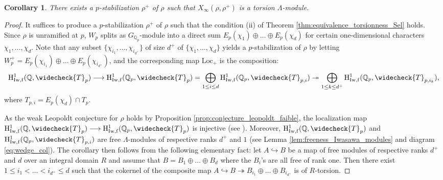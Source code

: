 \documentclass[12pt]{amsart}
\newcommand\bQ{\mathbb{Q}}
\newcommand\Qp{{\mathbb{Q}_p}}
\newcommand{\Loc}{\mathrm{Loc}}
\newcommand{\HH}{\mathrm{H}}
\newcommand{\ff}{\mathrm{f}}
\newcommand{\Iw}{\mathrm{Iw}}
\theoremstyle{defstyle}
\theoremstyle{thmstyle}
\newtheorem{corollaire}[subsubsection]{Corollary}
\begin{document}
\begin{corollaire}\label{coro:existence_p_stab_Sel_tors}
	There exists a $p$-stabilization $\rho^+$ of $\rho$ such that $X_\infty(\rho,\rho^+)$ is a torsion $\Lambda$-module.
\end{corollaire}
\begin{proof}
		 It suffices to produce a $p$-stabilization $\rho^+$ of $\rho$ such that the condition (ii) of Theorem \ref{thm:equivalence_torsionness_Sel} holds. Since $\rho$ is unramified at $p$, $W_p$ splits as $G_{\bQ_p}$-module into a direct sum $E_p(\chi_1)\oplus \ldots \oplus E_p(\chi_d)$ for certain one-dimensional characters $\chi_1,\ldots,\chi_d$. Note that any subset $\{\chi_{i_1},\ldots,\chi_{i_{d^+}}\}$ of size $d^+$ of $\{\chi_1,\ldots,\chi_d\}$ yields a $p$-stabilization of $\rho$ by letting $W_p^+=E_p(\chi_{i_1})\oplus \ldots\oplus E_p(\chi_{i_{d^+}})$, and the corresponding map $\Loc_+$ is the composition:
		 \[\HH^1_{\Iw,\ff}(\bQ,\widecheck{T}_p) \longrightarrow \HH^1_{\Iw,\ff}(\Qp,\widecheck{T}_p)=\bigoplus_{1\leq i\leq d} \HH^1_{\Iw,\ff}(\Qp,\widecheck{T}_{p,i}) \twoheadrightarrow \bigoplus_{1\leq k\leq d^+} \HH^1_{\Iw,\ff}(\Qp,\widecheck{T}_{p,i_k}),\]
		 where $T_{p,i}= E_p(\chi_d) \cap T_p$.
		 
		 As the weak Leopoldt conjecture for $\rho$ holds by Proposition \ref{prop:conjecture_leopoldt_faible}, the localization map  $\HH^1_{\Iw,\ff}(\bQ,\widecheck{T}_p) \longrightarrow \HH^1_{\Iw,\ff}(\Qp,\widecheck{T}_p)$ is injective (see \cite[\S1.3]{perrin1995fonctions}). Moreover, $\HH^1_{\Iw,\ff}(\bQ,\widecheck{T}_p)$ and $\HH^1_{\Iw,\ff}(\Qp,\widecheck{T}_{p,i})$ are free $\Lambda$-modules of respective ranks $d^+$ and $1$ (see Lemma \ref{lem:freeness_Iwasawa_modules} and diagram \eqref{eq:wedge_col}). The corollary then follows from the following elementary fact: let $A \hookrightarrow B$ be a map of free modules of respective ranks $d^+$ and $d$ over an integral domain $R$ and assume that $B=B_1\oplus \ldots \oplus B_d$ where the $B_i$'s are all free of rank one. Then there exist $1\leq i_1 <\ldots <i_{d^+}\leq d$ such that the cokernel of the composite map $A \hookrightarrow B \twoheadrightarrow B_{i_1} \oplus \ldots \oplus B_{i_{d^+}}$ is of $R$-torsion.
\end{proof}
\end{document}

